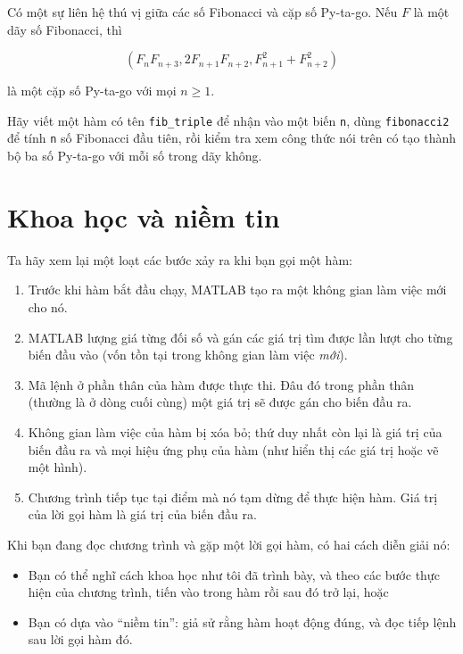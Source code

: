 \documentclass[12pt]{book}
\begin{document}
Có một sự liên hệ thú vị giữa các số Fibonacci và cặp số
Py-ta-go. Nếu $F$ là một dãy số Fibonacci, thì

\[ (F_n F_{n+3}, 2 F_{n+1} F_{n+2}, F_{n+1}^2 + F_{n+2}^2 ) \]

là một cặp số Py-ta-go với mọi $n \ge 1$.

\begin{ex}
Hãy viết một hàm có tên \verb#fib_triple# để nhận vào một
biến {\tt n}, dùng {\tt fibonacci2} để tính
{\tt n} số Fibonacci đầu tiên, rồi kiểm tra xem công thức
nói trên có tạo thành bộ ba số Py-ta-go với mỗi số trong 
dãy không.
\end{ex}



\section{Khoa học và niềm tin}

Ta hãy xem lại một loạt các bước xảy ra khi bạn gọi một hàm:

\begin{enumerate}

\item Trước khi hàm bắt đầu chạy, MATLAB tạo ra một không gian
làm việc mới cho nó.

\item MATLAB lượng giá từng đối số và gán các giá trị tìm được
lần lượt cho từng biến đầu vào (vốn tồn tại trong không gian
làm việc {\em mới}).

\item Mã lệnh ở phần thân của hàm được thực thi. Đâu đó trong 
phần thân (thường là ở dòng cuối cùng) một giá trị sẽ được gán
cho biến đầu ra.

\item Không gian làm việc của hàm bị xóa bỏ; thứ duy nhất 
còn lại là giá trị của biến đầu ra và mọi hiệu ứng phụ của hàm
(như hiển thị các giá trị hoặc vẽ một hình).

\item Chương trình tiếp tục tại điểm mà nó tạm dừng để thực
hiện hàm. Giá trị của lời gọi hàm là giá trị của biến đầu ra.

\end{enumerate}

Khi bạn đang đọc chương trình và gặp một lời gọi hàm, có hai cách
diễn giải nó:

\begin{itemize}

\item Bạn có thể nghĩ cách khoa học như tôi đã trình bày, và theo
các bước thực hiện của chương trình, tiến vào trong hàm rồi sau đó
trở lại, hoặc

\item Bạn có dựa vào ``niềm tin'': giả sử rằng hàm hoạt động đúng,
và đọc tiếp lệnh sau lời gọi hàm đó.

\end{itemize}
\end{document}
